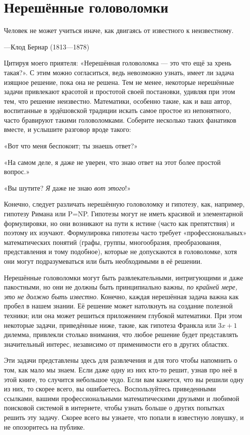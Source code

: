 \chapter*{Нерешённые головоломки}

\setlength{\epigraphwidth}{.55\textwidth}
\epigraph{Человек не может учиться иначе, как двигаясь от известного к неизвестному.}{---Клод Бернар (1813---1878)}

Цитируя моего приятеля: «Нерешённая головоломка --- это что ещё за хрень такая?».
С этим можно согласиться, ведь невозможно узнать, имеет ли задача изящное решение, пока она не решена.
Тем не менее, некоторые нерешённые задачи привлекают красотой и простотой своей постановки, удивляя при этом тем, что решение неизвестно.
Математики, особенно такие, как и ваш автор, воспитанные в эрдёшовской традиции искать самое простое из непонятного, часто бравируют такими головоломками.
Соберите несколько таких фанатиков вместе, и услышите разговор вроде такого:

«Вот что меня беспокоит; ты знаешь ответ?»

«На самом деле, я даже не уверен, что знаю ответ на этот более простой вопрос.»

«Вы шутите? \emph{Я} даже не знаю \emph{вот этого}!»

Конечно, следует различать нерешённую головоломку и гипотезу, как, например, гипотезу Римана или P=NP.
Гипотезы могут не иметь красивой и элементарной формулировки, но они возникают на пути к истине (часто как препятствия) и поэтому их изучают.
Формулировка гипотезы часто требует «профессиональных» математических понятий (графы, группы, многообразия, преобразования, представления и тому подобное), которые не допускаются в головоломке, хотя они могут подразумеваться или быть необходимыми в её решении.

Нерешённые головоломки могут быть развлекательными, интригующими и даже пакостными,
но они не должны быть принципиально важны, \emph{по крайней мере, это не должно быть известно}.
Конечно, каждая нерешённая задача важна как пробел в нашем знании.
Её решение может натолкнуть на создание полезной техники;
или она может решиться приложением глубокой математики.
При этом некоторые задачи, приведённые ниже, такие, как гипотеза Франкла или $3x+1$ дилемма, привлекли столько внимания, что любое решение будет представлять значительный интерес, независимо от применимости его в других областях.

Эти задачи представлены здесь для развлечения и для того чтобы напомнить о том, как мало мы знаем.
Если даже одну из них кто-то решит, узнав про неё в этой книге, то случится небольшое чудо.
Если вам кажется, что вы решили одну из них, то скорее всего, вы ошибаетесь.
Воспользуйтесь приведенными ссылками, вашими профессиональными математическими друзьями и любимой поисковой системой в интернете, чтобы узнать больше о других попытках решить эту задачу.
Скорее всего вы узнаете, что попали в известную ловушку, и не опозоритесь на публике.

